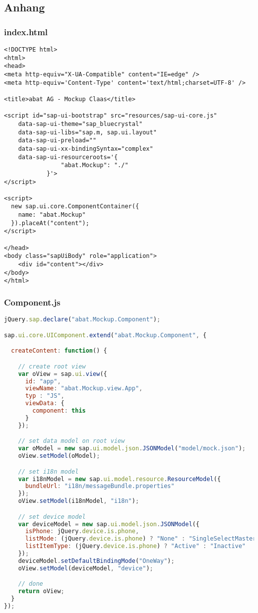 \subsection*{Anhang}\label{anhang}
\subsubsection*{index.html}
\begin{lstlisting}[language=HTML5, label=lst:index.html]
<!DOCTYPE html>
<html>
<head>
<meta http-equiv="X-UA-Compatible" content="IE=edge" />
<meta http-equiv='Content-Type' content='text/html;charset=UTF-8' />

<title>abat AG - Mockup Claas</title>

<script id="sap-ui-bootstrap" src="resources/sap-ui-core.js"
	data-sap-ui-theme="sap_bluecrystal"
	data-sap-ui-libs="sap.m, sap.ui.layout"
	data-sap-ui-preload=""
	data-sap-ui-xx-bindingSyntax="complex"
	data-sap-ui-resourceroots='{
				"abat.Mockup": "./"
			}'>
</script>

<script>
  new sap.ui.core.ComponentContainer({
    name: "abat.Mockup"
  }).placeAt("content");
</script>

</head>
<body class="sapUiBody" role="application">
	<div id="content"></div>
</body>
</html>
\end{lstlisting}

\newpage
\subsubsection*{Component.js}
\begin{lstlisting}[language=JavaScript, label=lst:Component.js]
jQuery.sap.declare("abat.Mockup.Component");

sap.ui.core.UIComponent.extend("abat.Mockup.Component", {

  createContent: function() {

    // create root view
    var oView = sap.ui.view({
      id: "app",
      viewName: "abat.Mockup.view.App",
      typ : "JS",
      viewData: {
        component: this
      }
    });

    // set data model on root view
    var oModel = new sap.ui.model.json.JSONModel("model/mock.json");
    oView.setModel(oModel);

    // set i18n model
    var i18nModel = new sap.ui.model.resource.ResourceModel({
      bundleUrl: "i18n/messageBundle.properties"
    });
    oView.setModel(i18nModel, "i18n");

    // set device model
    var deviceModel = new sap.ui.model.json.JSONModel({
      isPhone: jQuery.device.is.phone,
      listMode: (jQuery.device.is.phone) ? "None" : "SingleSelectMaster",
      listItemType: (jQuery.device.is.phone) ? "Active" : "Inactive"
    });
    deviceModel.setDefaultBindingMode("OneWay");
    oView.setModel(deviceModel, "device");

    // done
    return oView;
  }
});
\end{lstlisting}

